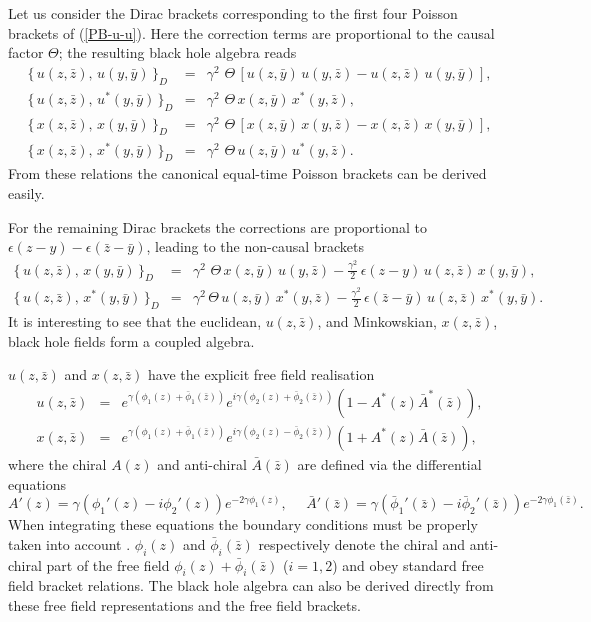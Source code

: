 \documentclass[a4paper,12pt]{article}
\begin{document}
Let us consider the Dirac brackets corresponding
to the first four Poisson brackets of (\ref{PB-u-u}).
Here the correction terms are proportional to
the causal factor $\Theta$; the resulting black hole algebra reads
\begin{eqnarray}\label{DB-u-u}
\{\,u(z,\bar z),\, u(y,\bar y)\,\}_D&=&\gamma^2\,
\,\Theta\,
[u(z,\bar y)\,u(y,\bar z)-
u(z,\bar z)\,u(y,\bar y)],\nonumber \\
\{\,u(z,\bar z),\, u^*(y,\bar y)\,\}_D&=&\gamma^2\,
\,\Theta\,
 x(z,\bar y)\,x^*(y,\bar z),\nonumber\\
\{\,x(z,\bar z),\, x(y,\bar y)\,\}_D&=&\gamma^2\,
\,\Theta\,
[x(z,\bar y)\,x(y,\bar z)-
x(z,\bar z)\,x(y,\bar y)],\nonumber\\
\{\,x(z,\bar z),\, x^*(y,\bar y)\,\}_D&=&\gamma^2\,
\,\Theta\,
u(z,\bar y)\,u^*(y,\bar z).
\end{eqnarray}
From these relations the canonical equal-time
Poisson brackets can be derived easily.

For the remaining Dirac brackets the corrections are proportional to
$\epsilon(z-y)-\epsilon(\bar z-\bar y)$, leading to the non-causal
brackets
\begin{eqnarray}
\label{DB-u-x}
\{\,u(z,\bar z),\, x(y,\bar y)\,\}_D&=&\gamma^2\,
\,\Theta\,
x(z,\bar y)\,u(y,\bar z)-
\frac{\gamma^2}{2}\,\epsilon(z-y)\,u(z,\bar z)\,x(y,\bar y),\nonumber\\
\{\,u(z,\bar z),\, x^*(y,\bar y)\,\}_D&=&\gamma^2\,
\Theta\,
u(z,\bar y)\,x^*(y,\bar z)-
\frac{\gamma^2}{2}\,\epsilon(\bar z-\bar y)\, u(z,\bar z)\,x^*(y,\bar y).
\end{eqnarray}
It is interesting to see that the euclidean, $u(z,\bar z)$,
 and  Minkowskian, $x(z,\bar z)$,
black hole fields form a coupled algebra.


$u(z,\bar z)$ and $x(z,\bar z)$ have the explicit free field
realisation
\begin{eqnarray}\label{urep}
u(z,\bar z)&=&
e^{\gamma(\phi_1(z)+\bar \phi_1(\bar z))}
e^{i\gamma(\phi_2(z)+\bar\phi_2(\bar z))}\left(1-A^*(z)\bar A^*(\bar z)
\right),\nonumber\\
x(z,\bar z)&=&e^{\gamma(\phi_1(z)+\bar \phi_1(\bar z))}
e^{i\gamma(\phi_2(z)-\bar\phi_2(\bar z))}\left(1+A^*(z)\bar A(\bar z)
\right),
\end{eqnarray}
where the chiral  $A(z)$ and anti-chiral $\bar A(\bar z)$
are defined via the differential equations
\begin{equation}
A'(z)=\gamma(\phi_1'(z)-i\phi_2'(z))e^{-2\gamma\phi_1(z)},
~~~~~~
\bar A'(\bar z)=\gamma(\bar\phi_1'(\bar z)-i\bar\phi_2'(\bar z))
e^{-2\gamma\phi_1(\bar z)}.
\end{equation}
When integrating these equations the boundary conditions must be
properly taken into account \cite{FJW}.
$\phi_i(z)$ and $\bar\phi_i(\bar z)$
respectively denote the chiral and anti-chiral part of
the  free field
$\phi_i(z)+\bar\phi_i(\bar z)$ ($i=1,2$)
 and obey standard free field bracket relations.
The black hole algebra can also be derived directly from these free field
representations and the free field brackets.
\end{document}
